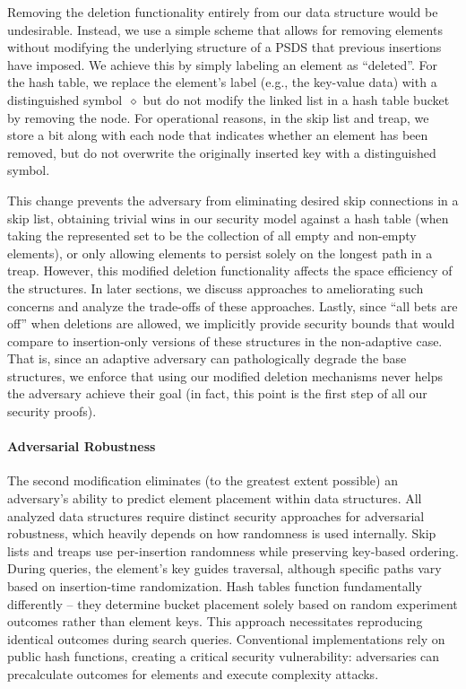 Removing the deletion functionality entirely from our data structure would be undesirable. Instead, we use a simple scheme that allows for removing elements without modifying the underlying structure of a PSDS that previous insertions have imposed. We achieve this by simply labeling an element as ``deleted''. For the hash table, we replace the element's label (e.g., the key-value data) with a distinguished symbol~$\diamond$ but do not modify the linked list in a hash table bucket by removing the node. For operational reasons, in the skip list and treap, we store a bit along with each node that indicates whether an element has been removed, but do not overwrite the originally inserted key with a distinguished symbol. 

This change prevents the adversary from eliminating desired skip connections in a skip list, obtaining trivial wins in our security model against a hash table (when taking the represented set to be the collection of all empty and non-empty elements), or only allowing elements to persist solely on the longest path in a treap. However, this modified deletion functionality affects the space efficiency of the structures. In later sections, we discuss approaches to ameliorating such concerns and analyze the trade-offs of these approaches. Lastly, since ``all bets are off'' when deletions are allowed, we implicitly provide security bounds that would compare to insertion-only versions of these structures in the non-adaptive case. That is, since an adaptive adversary can pathologically degrade the base structures, we enforce that using our modified deletion mechanisms never helps the adversary achieve their goal (in fact, this point is the first step of all our security proofs). 

\paragraph{Adversarial Robustness}
The second modification eliminates (to the greatest extent possible) an adversary's ability to predict element placement within data structures. All analyzed data structures require distinct security approaches for adversarial robustness, which heavily depends on how randomness is used internally. Skip lists and treaps use per-insertion randomness while preserving key-based ordering. During queries, the element's key guides traversal, although specific paths vary based on insertion-time randomization. Hash tables function fundamentally differently -- they determine bucket placement solely based on random experiment outcomes rather than element keys. This approach necessitates reproducing identical outcomes during search queries. Conventional implementations rely on public hash functions, creating a critical security vulnerability: adversaries can precalculate outcomes for elements and execute complexity attacks.

